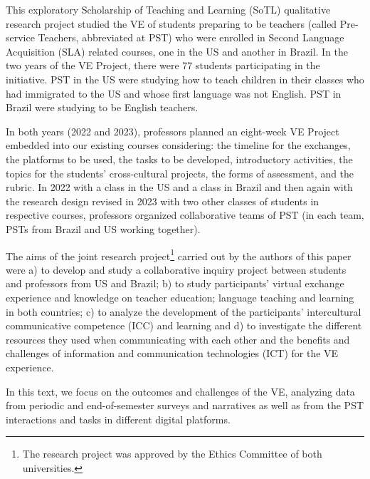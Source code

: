 This exploratory Scholarship of Teaching and Learning (SoTL) qualitative
research project \cite{stake2005qualitative} studied the VE of students preparing to
be teachers (called Pre-service Teachers, abbreviated at PST) who were
enrolled in Second Language Acquisition (SLA) related courses, one in
the US and another in Brazil. In the two years of the VE Project, there
were 77 students participating in the initiative. PST in the US were
studying how to teach children in their classes who had immigrated to
the US and whose first language was not English. PST in Brazil were
studying to be English teachers.

In both years (2022 and 2023), professors planned an eight-week VE
Project embedded into our existing courses considering: the timeline for
the exchanges, the platforms to be used, the tasks to be developed,
introductory activities, the topics for the students'
cross-cultural projects, the forms of assessment, and the rubric. In
2022 with a class in the US and a class in Brazil and then again with
the research design revised in 2023 with two other classes of students
in respective courses, professors organized collaborative teams of PST
(in each team, PSTs from Brazil and US working together).

The aims of the joint research project\footnote{The research project was
	approved by the Ethics Committee of both universities.} carried out by
the authors of this paper were a) to develop and study a collaborative
inquiry project between students and professors from US and Brazil; b)
to study participants' virtual exchange experience and knowledge on
teacher education; language teaching and learning in both countries; c)
to analyze the development of the participants' intercultural
communicative competence (ICC) and learning and d) to investigate
the different resources they used when communicating with each other and
the benefits and challenges of information and communication
technologies (ICT) for the VE experience.

In this text, we focus on the outcomes and challenges of the VE,
analyzing data from periodic and end-of-semester surveys and narratives
as well as from the PST interactions and tasks in different digital
platforms.
